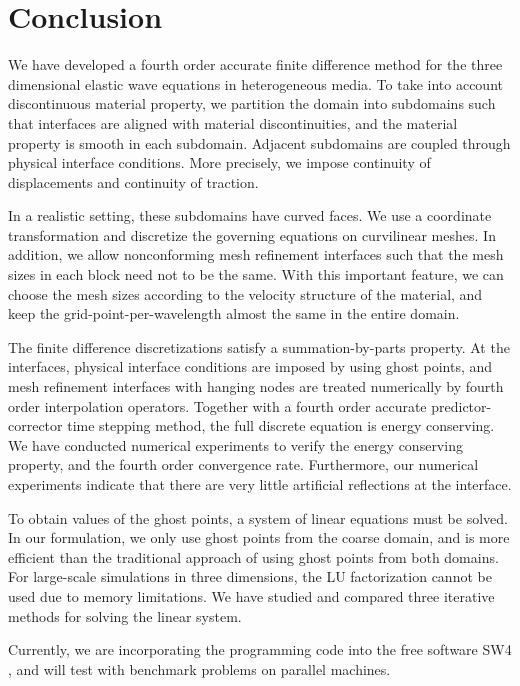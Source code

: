\section{Conclusion}
We have developed a fourth order accurate finite difference method for the three dimensional elastic wave equations in heterogeneous media. To take into account discontinuous material property, we partition the domain into subdomains such that interfaces are aligned with material discontinuities, and the material property is smooth in each subdomain. Adjacent subdomains are coupled through physical interface conditions. More precisely, we impose continuity of displacements and continuity of traction. 

In a realistic setting, these subdomains have curved faces. We use a coordinate transformation and discretize the governing equations on curvilinear meshes. In addition, we allow nonconforming mesh refinement interfaces such that the mesh sizes in each block need not to be the same. With this important feature, we can choose the mesh sizes according to the velocity structure of the material, and keep the grid-point-per-wavelength almost the same in the entire domain. 

The finite difference discretizations satisfy a summation-by-parts property. At the interfaces, physical interface conditions are imposed by using ghost points, and mesh refinement interfaces with hanging nodes are treated numerically by fourth order interpolation operators. Together with a fourth order accurate predictor-corrector time stepping method, the full discrete equation is energy conserving. We have conducted numerical experiments to verify the energy conserving property, and the fourth order convergence rate. Furthermore, our numerical experiments indicate that there are very little artificial reflections at the interface.

To obtain values of the ghost points, a system of linear equations must be solved. In our formulation, we only use ghost points from the coarse domain, and is more efficient than the traditional approach of using ghost points from both domains.  For large-scale simulations in three dimensions, the LU factorization cannot be used due to memory limitations. We have studied and compared three iterative methods for solving the linear system.

Currently, we are incorporating the programming code into the free software SW4 \cite{SW4}, and will test with benchmark problems on parallel machines. 